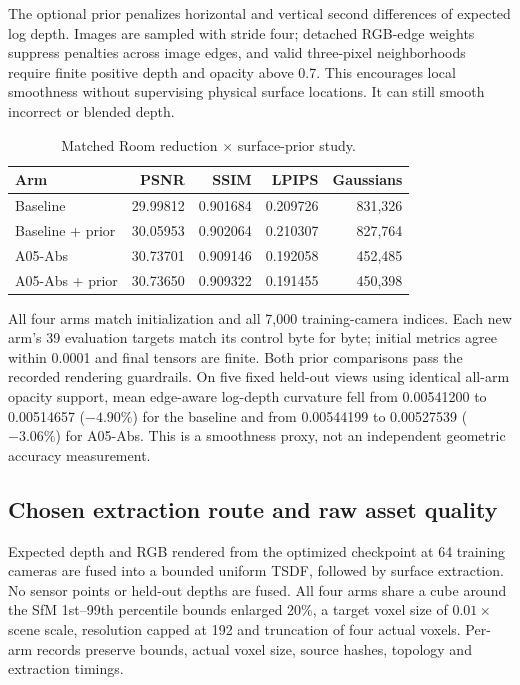 \documentclass[11pt,a4paper]{article}
\begin{document}
The optional prior penalizes horizontal and vertical second differences of
expected log depth. Images are sampled with stride four; detached RGB-edge
weights suppress penalties across image edges, and valid three-pixel
neighborhoods require finite positive depth and opacity above 0.7. This
encourages local smoothness without supervising physical surface locations.
It can still smooth incorrect or blended depth.

\begin{table}[!ht]
\centering\small
\begin{tabularx}{\linewidth}{@{}Yrrrr@{}}
\toprule
\textbf{Arm} & \textbf{PSNR} & \textbf{SSIM} & \textbf{LPIPS} & \textbf{Gaussians} \\
\midrule
Baseline & 29.99812 & 0.901684 & 0.209726 & 831,326 \\
Baseline + prior & 30.05953 & 0.902064 & 0.210307 & 827,764 \\
A05-Abs & 30.73701 & 0.909146 & 0.192058 & 452,485 \\
A05-Abs + prior & 30.73650 & 0.909322 & 0.191455 & 450,398 \\
\bottomrule
\end{tabularx}
\caption{Matched Room reduction $\times$ surface-prior study.}
\label{tab:surface-render}
\end{table}

All four arms match initialization and all 7,000 training-camera indices.
Each new arm's 39 evaluation targets match its control byte for byte;
initial metrics agree within 0.0001 and final tensors are finite. Both
prior comparisons pass the recorded rendering guardrails. On five fixed
held-out views using identical all-arm opacity support, mean edge-aware
log-depth curvature fell from 0.00541200 to 0.00514657 ($-4.90\%$) for the
baseline and from 0.00544199 to 0.00527539 ($-3.06\%$) for A05-Abs. This is
a smoothness proxy, not an independent geometric accuracy measurement.

\clearpage
\subsection{Chosen extraction route and raw asset quality}
Expected depth and RGB rendered from the optimized checkpoint at 64 training
cameras are fused into a bounded uniform TSDF, followed by surface extraction.
No sensor points or held-out depths are fused. All four arms share a cube
around the SfM 1st--99th percentile bounds enlarged 20\%, a target voxel size
of $0.01\times$ scene scale, resolution capped at 192 and truncation of four
actual voxels. Per-arm records preserve bounds, actual voxel size, source
hashes, topology and extraction timings.
\end{document}
